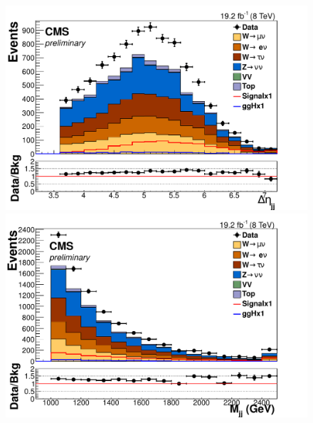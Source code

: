 \begin{figure}
  \includegraphics[width=.65\largefigwidth]{plots/parked/AN-14-243-figs/output_presel/nunu_dijet_deta.pdf}
  \includegraphics[width=.65\largefigwidth]{plots/parked/AN-14-243-figs/output_presel/nunu_dijet_M.pdf}
  

\end{figure}
